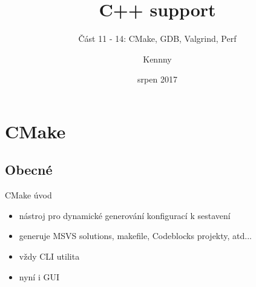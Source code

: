 \documentclass{beamer}
\begin{document}
\title{C++ support}
\subtitle{Část 11 - 14: CMake, GDB, Valgrind, Perf}
\author{Kennny}
\date{srpen 2017}

\frame{\titlepage}


\newenvironment{xframe}[1][]
  {\begin{frame}[fragile,environment=xframe,#1]}
  {\end{frame}}

\begin{comment}
\begin{xframe}{tttt}
	\begin{itemize}
		\item
	\end{itemize}
\end{xframe}
\end{comment}



\section{CMake}
\subsection{Obecné}

\begin{xframe}{CMake úvod}
	\begin{itemize}
		\item nástroj pro dynamické generování konfigurací k sestavení
		\item generuje MSVS solutions, makefile, Codeblocks projekty, atd...
		\item vždy CLI utilita
		\item nyní i GUI
	\end{itemize}
\end{xframe}
\end{document}
